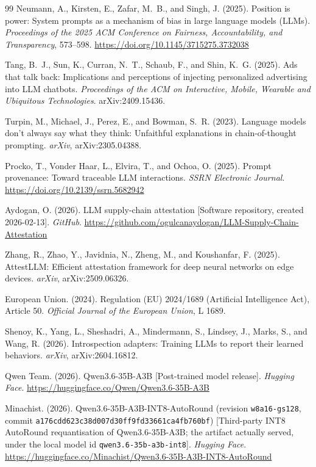 \documentclass{article}
\begin{document}
\begin{thebibliography}{99}
Neumann, A., Kirsten, E., Zafar, M.~B., and Singh, J. (2025). Position is
power: System prompts as a mechanism of bias in large language models (LLMs).
\emph{Proceedings of the 2025 ACM Conference on Fairness, Accountability, and
Transparency}, 573--598. \url{https://doi.org/10.1145/3715275.3732038}

Tang, B.~J., Sun, K., Curran, N.~T., Schaub, F., and Shin, K.~G. (2025). Ads
that talk back: Implications and perceptions of injecting personalized
advertising into LLM chatbots. \emph{Proceedings of the ACM on Interactive,
Mobile, Wearable and Ubiquitous Technologies}. arXiv:2409.15436.

Turpin, M., Michael, J., Perez, E., and Bowman, S.~R. (2023). Language models
don't always say what they think: Unfaithful explanations in chain-of-thought
prompting. \emph{arXiv}, arXiv:2305.04388.

Procko, T., Vonder Haar, L., Elvira, T., and Ochoa, O. (2025). Prompt
provenance: Toward traceable LLM interactions. \emph{SSRN Electronic Journal}.
\url{https://doi.org/10.2139/ssrn.5682942}

Aydogan, O. (2026). LLM supply-chain attestation [Software repository, created
2026-02-13]. \emph{GitHub}.
\url{https://github.com/ogulcanaydogan/LLM-Supply-Chain-Attestation}

Zhang, R., Zhao, Y., Javidnia, N., Zheng, M., and Koushanfar, F. (2025).
AttestLLM: Efficient attestation framework for deep neural networks on edge
devices. \emph{arXiv}, arXiv:2509.06326.

European Union. (2024). Regulation (EU) 2024/1689 (Artificial Intelligence
Act), Article 50. \emph{Official Journal of the European Union}, L 1689.

Shenoy, K., Yang, L., Sheshadri, A., Mindermann, S., Lindsey, J., Marks, S.,
and Wang, R. (2026). Introspection adapters: Training LLMs to report their
learned behaviors. \emph{arXiv}, arXiv:2604.16812.

Qwen Team. (2026). Qwen3.6-35B-A3B [Post-trained model release]. \emph{Hugging
Face}. \url{https://huggingface.co/Qwen/Qwen3.6-35B-A3B}

Minachist. (2026). Qwen3.6-35B-A3B-INT8-AutoRound (revision
\texttt{w8a16-gs128}, commit
\texttt{a176cdd623c38d007d30ff9fd33661ca4fb760bf}) [Third-party INT8 AutoRound
requantisation of Qwen3.6-35B-A3B; the artifact actually served, under the local
model id \texttt{qwen3.6-35b-a3b-int8}]. \emph{Hugging Face}.
\url{https://huggingface.co/Minachist/Qwen3.6-35B-A3B-INT8-AutoRound}


\end{thebibliography}
\end{document}
